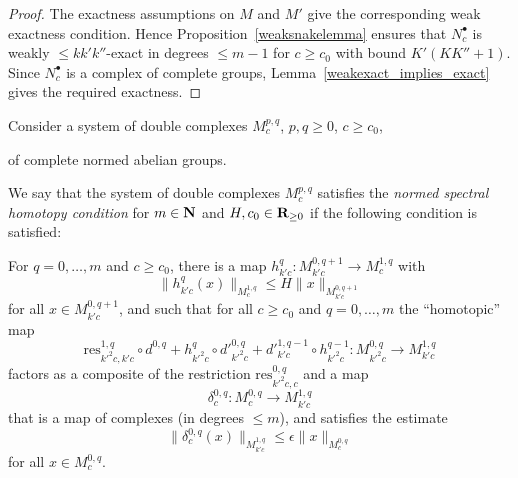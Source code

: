\begin{proof}
  The exactness assumptions on $M$ and $M'$ give the corresponding
  weak exactness condition. Hence Proposition~\ref{weaksnakelemma}
  ensures that $N^\bullet_c$ is weakly $\leq kk'k''$-exact in degrees
  $\leq m-1$ for $c\geq c_0$ with bound $K'(KK'' + 1)$.
  Since $N^\bullet_c$ is a complex of complete groups,
  Lemma~\ref{weakexact_implies_exact} gives the required exactness.
\end{proof}

Consider a system of double complexes $M^{p,q}_c$, $p,q\geq 0$, $c\geq c_0$,
\begin{center}
\end{center}
of complete normed abelian groups.

\begin{definition}
  \label{spectral-htpy}
  \leanok
  We say that the system of double complexes $M^{p,q}_c$
  satisfies the \emph{normed spectral homotopy condition}
  for $m \in \mathbf{N}$ and $H, c_0 \in \mathbf{R}_{\ge 0}$
  if the following condition is satisfied:

  For $q=0,\ldots,m$ and $c\geq c_0$,
  there is a map $h^q_{k'c} \colon M^{0,q+1}_{k'c}\to M^{1,q}_c$ with
  \[
    \|h^q_{k'c}(x)\|_{M^{1,q}_c} \leq H\|x\|_{M^{0,q+1}_{k'c}}
  \]
  for all $x\in M^{0,q+1}_{k'c}$,
  and such that for all $c\geq c_0$ and $q=0,\ldots,m$ the ``homotopic'' map
  \[
    \mathrm{res}_{k'^2c,k'c}^{1,q}\circ d^{0,q} +
    h^q_{k'^2c}\circ d'^{0,q}_{k'^2c} +
    d'^{1,q-1}_{k'c}\circ h^{q-1}_{k'^2c} \colon
      M^{0,q}_{k'^2c}\to M^{1,q}_{k'c}
  \]
  factors as a composite of the restriction $\mathrm{res}_{k'^2c,c}^{0,q}$ and a map
  \[
    \delta^{0,q}_c \colon M^{0,q}_c\to M^{1,q}_{k'c}
  \]
  that is a map of complexes (in degrees $\leq m$), and satisfies the estimate
  \begin{equation}\label{eq:homotopicmapsmall}
  \|\delta^{0,q}_c(x)\|_{M^{1,q}_{k'c}}\leq \epsilon \|x\|_{M^{0,q}_c}
  \end{equation}
  for all $x\in M^{0,q}_c$.
\end{definition}

